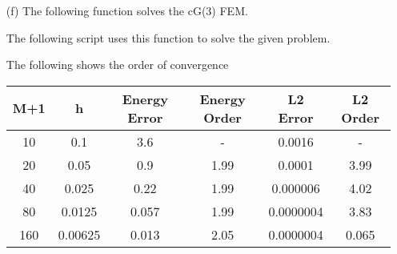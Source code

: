 \documentclass[11pt, oneside]{article}
\begin{document}
\begin{enumerate}
\begin{enumerate}
      \item[(f)]
        The following function solves the cG(3) FEM.
        
        The following script uses this function to solve the given problem.
        

        The following shows the order of convergence
        \begin{center}
          \begin{tabular}{cccccc}
            \toprule
            M+1 & h & Energy Error & Energy Order & L2 Error & L2 Order \\
            \midrule
             10 & 0.1     & 3.6   & -    & 0.0016    & -\\
             20 & 0.05    & 0.9   & 1.99 & 0.0001    & 3.99\\
             40 & 0.025   & 0.22  & 1.99 & 0.000006  & 4.02\\
             80 & 0.0125  & 0.057 & 1.99 & 0.0000004 & 3.83\\
            160 & 0.00625 & 0.013 & 2.05 & 0.0000004 & 0.065\\
            \bottomrule
          \end{tabular}
        \end{center}
    \end{enumerate}

\end{enumerate}
\end{document}
